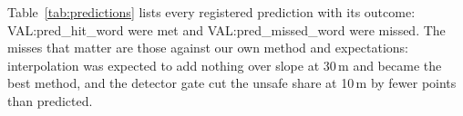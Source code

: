 Table~\ref{tab:predictions} lists every registered prediction with its outcome: {{VAL:pred_hit_word}} were met and {{VAL:pred_missed_word}} were missed. The misses that matter are those against our own method and expectations: interpolation was expected to add nothing over slope at 30\,m and became the best method, and the detector gate cut the unsafe share at 10\,m by fewer points than predicted.
